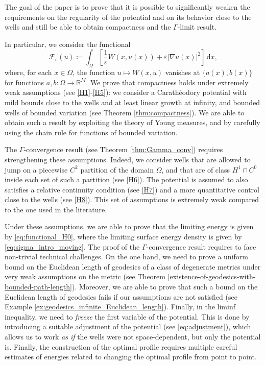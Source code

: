 \documentclass[a4paper, 11pt, reqno]{amsart}
\theoremstyle{plain}
\theoremstyle{definition}
\theoremstyle{remark}
\newcommand{\R}{\mathbb R}
\newcommand{\dd}{\,\mathrm{d}}
\begin{document}
The goal of the paper is to prove that it is possible to significantly weaken the requirements on the regularity of the potential and on its behavior close to the wells and still be able to obtain compactness and the $\Gamma$-limit result.

In particular, we consider the functional
\[
\mathcal{F}_\varepsilon(u) \coloneqq \int_\Omega \left[ \frac{1}{\varepsilon}W(x,u(x)) + \varepsilon|\nabla u(x)|^2 \right] \dd x,
\]
where, for each $x\in\Omega$, the function $u\mapsto W(x,u)$ vanishes at $\{a(x), b(x)\}$ for functions $a,b:\Omega\to\R^M$.
We prove that compactness holds under extremely weak assumptions (see \ref{H1}-\ref{H5}): we consider a Carath\'{e}odory potential with mild bounds close to the wells and at least linear growth at infinity, and bounded wells of bounded variation (see Theorem \ref{thm:compactness}).
We are able to obtain such a result by exploiting the theory of Young measures, and by carefully using the chain rule for functions of bounded variation.

The $\Gamma$-convergence result (see Theorem \ref{thm:Gamma_conv}) requires strengthening these assumptions.
Indeed, we consider wells that are allowed to jump on a piecewise $C^2$ partition of the domain $\Omega$, and that are of class $H^1\cap C^0$ inside each set of such a partition (see \ref{H6}).
The potential is assumed to also satisfies a relative continuity condition (see \ref{H7}) and a more quantitative control close to the wells (see \ref{H8}).
This set of assumptions is extremely weak compared to the one used in the literature.

Under these assumptions, we are able to prove that the limiting energy is given by \eqref{eq:functional_H0}, where the limiting surface energy density is given by \eqref{eq:sigma_intro_moving}.
The proof of the $\Gamma$-convergence result requires to face non-trivial technical challenges. On the one hand, we need to prove a uniform bound on the Euclidean length of geodesics of a class of degenerate metrics under very weak assumptions on the metric (see Theorem \ref{existence-of-geodesics-with-bounded-path-length}).
Moreover, we are able to prove that such a bound on the Euclidean length of geodesics fails if our assumptions are not satisfied (see Example \ref{ex:geodesics_infinite_Euclidean_length}).
Finally, in the liminf inequality, we need to \emph{freeze} the first variable of the potential.
This is done by introducing a suitable adjustment of the potential (see \eqref{eq:adjustment}), which allows us to work \emph{as if} the wells were not space-dependent, but only the potential is.
Finally, the construction of the optimal profile requires multiple careful estimates of energies related to changing the optimal profile from point to point.
\end{document}
